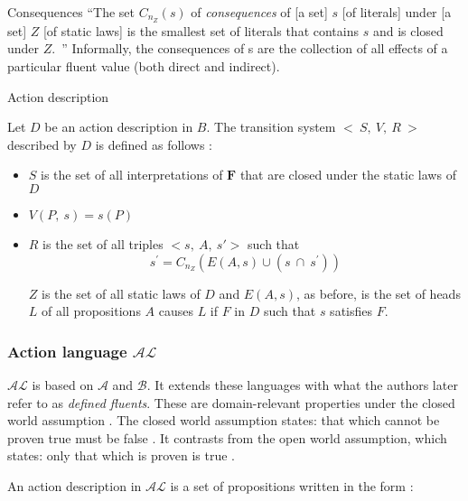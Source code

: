 \begin{definition}{Consequences}
    ``The set $C_{n_Z}\left(s\right)$ of \textit{consequences} of [a set] $s$ [of literals] under [a set] $Z$ [of static laws] is the smallest set of literals that contains $s$ and is closed under $Z$.~\cite{gelfond_action_1998}''
    Informally, the consequences of s are the collection of all effects of a particular fluent value (both direct and indirect).
\end{definition}

\begin{definition}{Action description}

    Let $D$ be an action description in $B$.
    The transition system $<\ S,\ V,\ R\ >$ described by $D$ is defined as follows \cite{gelfond_action_1998}:

    \begin{itemize}
        \item $S$ is the set of all interpretations of $\boldsymbol{F}$ that are closed under the static laws of $D$
        \item $V(P,\ s)=s(P)$
        \item $R$ is the set of all triples $<s,\ A,\ s\prime>$ such that
            $$
            s^\prime=C_{n_Z}\left(E\left(A,s\right)\cup\left(s\ \cap\ s^\prime\right)\right)
            $$

            $ Z $ is the set of all static laws of $D$ and $E(A, s)$, as before, is the set of heads $L$ of all propositions $A$ causes $L$ if $F$ in $D$ such that $s$ satisfies $F$.
    \end{itemize}
\end{definition}

\subsubsection{Action language $ \mathcal{AL} $}
\label{subsubsec:action_language_al}

$ \mathcal{AL} $ is based on $ \mathcal{A} $ and $ \mathcal{B} $.
It extends these languages with what the authors later refer to as \textit{defined fluents}.
These are domain-relevant properties under the closed world assumption \cite{blount_architecture_2013}.
The closed world assumption states: that which cannot be proven true must be false \cite{reiter_closed_1981}.
It contrasts from the open world assumption, which states: only that which is proven is true \cite{reiter_closed_1981}.

An action description in $ \mathcal{AL} $ is a set of propositions written in the form \cite{baral_reasoning_2000, blount_architecture_2013}:

